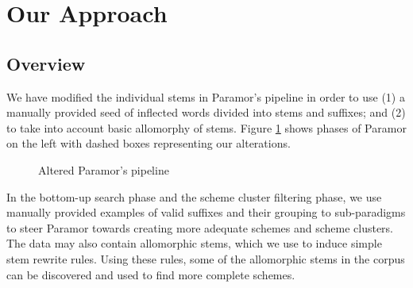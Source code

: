 \documentclass[11pt]{article}
\begin{document}
%

\section{Our Approach}

\subsection{Overview}


\noindent
We have modified the individual stems in Paramor's pipeline in order to use (1) a manually provided seed of inflected words divided into stems and suffixes; and (2) to take into account basic allomorphy of stems.
%
Figure \ref{fig:overview} shows phases of Paramor on the left with dashed boxes representing our alterations.


\begin{figure}
\begin{center}

\caption{Altered Paramor's pipeline}
\label{fig:overview}
\end{center}
\end{figure}

In the bottom-up search phase and the scheme cluster filtering phase, we use manually provided examples of valid suffixes and their grouping to sub-paradigms to steer Paramor towards creating more adequate schemes and scheme clusters. The data may also contain allomorphic stems, which we use to induce simple stem rewrite rules. Using these rules, some of the allomorphic stems in the corpus can be discovered and used to find more complete schemes. %
\end{document}
